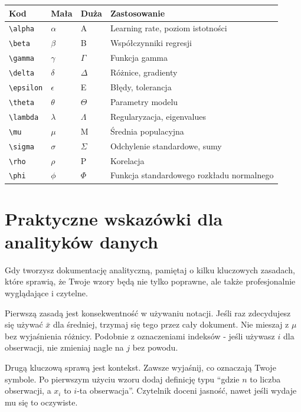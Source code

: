 \documentclass[
  polish,
  letterpaper,
  DIV=11,
  numbers=noendperiod]{scrreprt}
\begin{document}
\begin{longtable}[]{@{}llll@{}}
\toprule\noalign{}
Kod & Mała & Duża & Zastosowanie \\
\midrule\noalign{}
\endhead
\bottomrule\noalign{}
\endlastfoot
\texttt{\textbackslash{}alpha} & \(\alpha\) & A & Learning rate, poziom
istotności \\
\texttt{\textbackslash{}beta} & \(\beta\) & B & Współczynniki
regresji \\
\texttt{\textbackslash{}gamma} & \(\gamma\) & \(\Gamma\) & Funkcja
gamma \\
\texttt{\textbackslash{}delta} & \(\delta\) & \(\Delta\) & Różnice,
gradienty \\
\texttt{\textbackslash{}epsilon} & \(\epsilon\) & E & Błędy,
tolerancja \\
\texttt{\textbackslash{}theta} & \(\theta\) & \(\Theta\) & Parametry
modelu \\
\texttt{\textbackslash{}lambda} & \(\lambda\) & \(\Lambda\) &
Regularyzacja, eigenvalues \\
\texttt{\textbackslash{}mu} & \(\mu\) & M & Średnia populacyjna \\
\texttt{\textbackslash{}sigma} & \(\sigma\) & \(\Sigma\) & Odchylenie
standardowe, sumy \\
\texttt{\textbackslash{}rho} & \(\rho\) & P & Korelacja \\
\texttt{\textbackslash{}phi} & \(\phi\) & \(\Phi\) & Funkcja
standardowego rozkładu normalnego \\
\end{longtable}

\section{Praktyczne wskazówki dla analityków
danych}\label{praktyczne-wskazuxf3wki-dla-analitykuxf3w-danych}

Gdy tworzysz dokumentację analityczną, pamiętaj o kilku kluczowych
zasadach, które sprawią, że Twoje wzory będą nie tylko poprawne, ale
także profesjonalnie wyglądające i czytelne.

Pierwszą zasadą jest konsekwentność w używaniu notacji. Jeśli raz
zdecydujesz się używać \(\bar{x}\) dla średniej, trzymaj się tego przez
cały dokument. Nie mieszaj z \(\mu\) bez wyjaśnienia różnicy. Podobnie z
oznaczeniami indeksów - jeśli używasz \(i\) dla obserwacji, nie zmieniaj
nagle na \(j\) bez powodu.

Drugą kluczową sprawą jest kontekst. Zawsze wyjaśnij, co oznaczają Twoje
symbole. Po pierwszym użyciu wzoru dodaj definicję typu ``gdzie \(n\) to
liczba obserwacji, a \(x_i\) to \(i\)-ta obserwacja''. Czytelnik doceni
jasność, nawet jeśli wydaje mu się to oczywiste.
\end{document}
